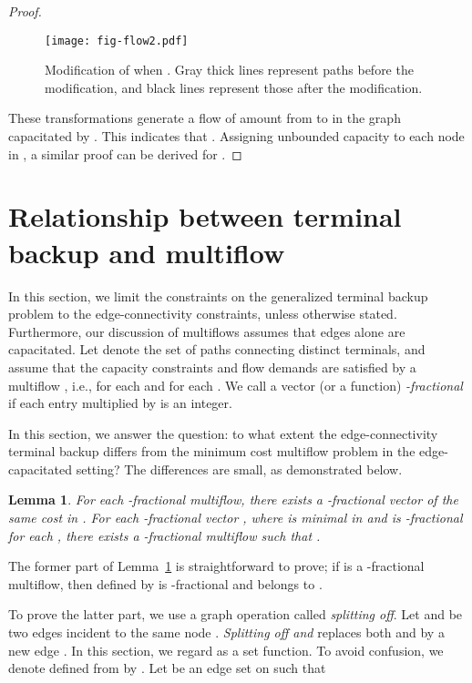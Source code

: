 \documentclass{article}
\newtheorem{lemma}{Lemma}
\begin{document}
\begin{proof}
\begin{figure}\centering
\texttt{[image: fig-flow2.pdf]}
\caption{Modification of  when . Gray thick lines represent paths before the modification,
and black lines represent those after the modification.}\label{fig.flow2}
\end{figure}


These transformations generate a flow of amount  from  to 
in the graph capacitated by .
This indicates that .  
Assigning unbounded capacity to each node in ,
a similar proof can be derived for .
\end{proof}




\section{Relationship between terminal backup and multiflow}
\label{sec:half_integralty_of_minimum_cost_multiflow}

In this section, we limit the constraints on the generalized terminal backup problem
to the edge-connectivity constraints, unless otherwise stated.
Furthermore, our discussion of multiflows assumes
that edges alone are capacitated.
Let  denote the set of paths connecting distinct terminals,
and assume that the capacity constraints and flow demands are satisfied by 
a multiflow ,
i.e.,  for each 
and  for each .
We call a vector (or a function) 
\emph{-fractional} if each entry multiplied by  is an integer.

In this section,
we answer the question: to what extent 
the edge-connectivity terminal backup differs from the 
minimum cost multiflow problem in the edge-capacitated setting?
The differences are small, as demonstrated below.

\begin{lemma}\label{lem.fractionality}
For each -fractional multiflow, 
there exists a -fractional vector of the same cost in .
For each -fractional vector , where
 is minimal in  and 
 is -fractional for each , there exists a -fractional
multiflow 
such that .
\end{lemma}

The former part of Lemma~\ref{lem.fractionality} is straightforward to prove;
if  is a -fractional multiflow,
then  defined by 
is -fractional and belongs to .

To prove the latter part, we use a graph operation called \emph{splitting off}.
Let  and  be two edges incident to the same node .
\emph{Splitting off  and } replaces both  and  by a new edge .
In this section, we regard  as a set function.
To avoid confusion, we denote  defined from  by .
Let  be an edge set on  such that 
\end{document}
